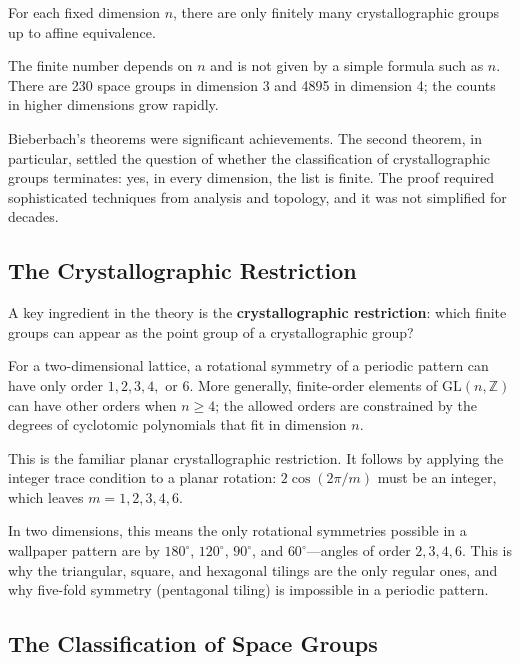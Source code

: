 \begin{corollary}\label{cor:bieberbach-finite}
For each fixed dimension $n$, there are only finitely many crystallographic groups up to affine equivalence.
\end{corollary}

The finite number depends on $n$ and is not given by a simple formula such as $n$. There are 230 space groups in dimension 3 and 4895 in dimension 4; the counts in higher dimensions grow rapidly.

Bieberbach's theorems were significant achievements. The second theorem, in particular, settled the question of whether the classification of crystallographic groups terminates: yes, in every dimension, the list is finite. The proof required sophisticated techniques from analysis and topology, and it was not simplified for decades.

\subsection{The Crystallographic Restriction}

A key ingredient in the theory is the \textbf{crystallographic restriction}: which finite groups can appear as the point group of a crystallographic group?

\begin{theorem}\label{thm:crystallographic-restriction}
For a two-dimensional lattice, a rotational symmetry of a periodic pattern can have only order $1,2,3,4,$ or $6$. More generally, finite-order elements of $\mathrm{GL}(n,\mathbb{Z})$ can have other orders when $n\geq4$; the allowed orders are constrained by the degrees of cyclotomic polynomials that fit in dimension $n$.
\end{theorem}

This is the familiar planar crystallographic restriction. It follows by applying the integer trace condition to a planar rotation: $2\cos(2\pi/m)$ must be an integer, which leaves $m=1,2,3,4,6$.

In two dimensions, this means the only rotational symmetries possible in a wallpaper pattern are by $180^\circ$, $120^\circ$, $90^\circ$, and $60^\circ$---angles of order $2, 3, 4, 6$. This is why the triangular, square, and hexagonal tilings are the only regular ones, and why five-fold symmetry (pentagonal tiling) is impossible in a periodic pattern.

\subsection{The Classification of Space Groups}

